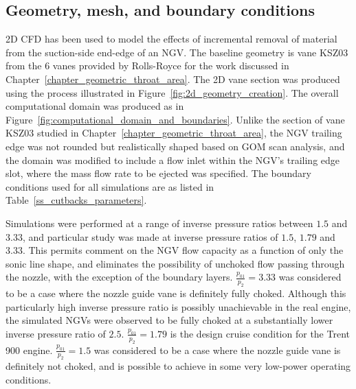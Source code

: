 \documentclass[a4paper, 11pt, oneside]{report}
\begin{document}
\subsection{Geometry, mesh, and boundary conditions}

2D CFD has been used to model the effects of incremental removal of material from the suction-side end-edge of an NGV. The baseline geometry is vane KSZ03 from the 6 vanes provided by Rolls-Royce for the work discussed in Chapter~\ref{chapter_geometric_throat_area}. The 2D vane section was produced using the process illustrated in Figure~\ref{fig:2d_geometry_creation}. The overall computational domain was produced as in Figure~\ref{fig:computational_domain_and_boundaries}. Unlike the section of vane KSZ03 studied in Chapter~\ref{chapter_geometric_throat_area}, the NGV trailing edge was not rounded but realistically shaped based on GOM scan analysis, and the domain was modified to include a flow inlet within the NGV's trailing edge slot, where the mass flow rate to be ejected was specified. The boundary conditions used for all simulations are as listed in Table~\ref{ss_cutbacks_parameters}.

Simulations were performed at a range of inverse pressure ratios between $1.5$ and $3.33$, and particular study was made at inverse pressure ratios of $1.5$, $1.79$ and $3.33$. This permits comment on the NGV flow capacity as a function of only the sonic line shape, and eliminates the possibility of unchoked flow passing through the nozzle, with the exception of the boundary layers. $\frac{p_{01}}{p_2}=3.33$ was considered to be a case where the nozzle guide vane is definitely fully choked. Although this particularly high inverse pressure ratio is possibly unachievable in the real engine, the simulated NGVs were observed to be fully choked at a substantially lower inverse pressure ratio of $2.5$. $\frac{p_{01}}{p_2}=1.79$ is the design cruise condition for the Trent 900 engine. $\frac{p_{01}}{p_2}=1.5$ was considered to be a case where the nozzle guide vane is definitely not choked, and is possible to achieve in some very low-power operating conditions. 
\end{document}
